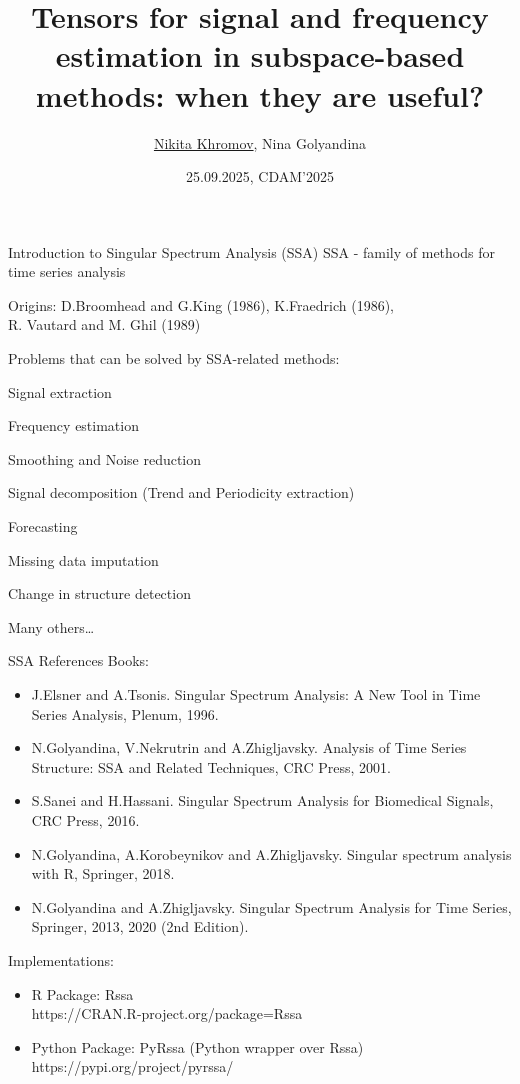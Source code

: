 \documentclass[pdf, unicode, ucs, notheorems]{beamer}
\title[Tensor SSA]{Tensors for signal and frequency estimation in
subspace-based methods: when they are useful?}
\author[Khromov N., Golyandina N.]{\texorpdfstring{\underline{Nikita
Khromov}}{Nikita Khromov}, Nina Golyandina}
\institute[SPbU]{%
  \small
  \vspace{0.2cm}\\
  St.\,Petersburg State University\\
  Department of Statistical Modeling\\
  \vspace{0.1cm}
}
\date{\small 25.09.2025, CDAM'2025}
\newcommand{\bluetext}[1]{{\usebeamercolor[fg]{bluetext_color}#1}}
\theoremstyle{definition}
\begin{document}
\begin{frame}[plain]
  \titlepage
\end{frame}

\begin{frame}{Introduction to Singular Spectrum Analysis (SSA)}
  SSA - family of methods for time series analysis

  Origins: D.Broomhead and G.King  (1986), K.Fraedrich (1986),\\
  R. Vautard and M. Ghil (1989)

  \bigskip

  Problems that can be solved by SSA-related methods:
  \begin{itemize}
      \bluetext{
      \item Signal extraction
      \item Frequency estimation
      }
    \item Smoothing and Noise reduction
    \item Signal decomposition (Trend and Periodicity extraction)
    \item Forecasting
    \item Missing data imputation
    \item Change in structure detection
    \item Many others\dots
  \end{itemize}
\end{frame}

\begin{frame}{SSA References}
  Books:
  \begin{itemize}
    \item J.Elsner and A.Tsonis. Singular Spectrum Analysis: A New Tool in
      Time Series Analysis, Plenum, 1996.
    \item N.Golyandina, V.Nekrutrin and A.Zhigljavsky. Analysis of Time
      Series Structure: SSA and Related Techniques, CRC Press, 2001.
    \item S.Sanei and H.Hassani. Singular Spectrum Analysis for Biomedical
      Signals, CRC Press, 2016.
    \item N.Golyandina, A.Korobeynikov and A.Zhigljavsky. Singular spectrum
      analysis with R, Springer, 2018.
    \item N.Golyandina and A.Zhigljavsky. Singular Spectrum Analysis for
      Time Series, Springer, 2013, 2020 (2nd Edition).
  \end{itemize}

  \bigskip

  Implementations:
  \begin{itemize}
    \item R Package: Rssa \\
      \hspace{2ex} https://CRAN.R-project.org/package=Rssa
    \item Python Package: PyRssa (Python wrapper over Rssa) \\
      \hspace{2ex} https://pypi.org/project/pyrssa/
  \end{itemize}
\end{frame}
\end{document}
